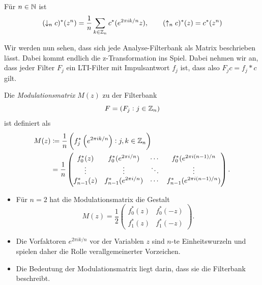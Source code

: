 \begin{proposition}
Für $ n \in \mathbb{N} $ ist
\[
    (\downarrow_{n}c)^{*}(z^{n})
  = \frac{1}{n} \sum_{k \in \mathbb{Z}_{n}} c^{*}(e^{2\pi ik/n}z), \qquad
    (\uparrow_{n}c)^{*}(z) = c^{*}(z^{n})
\]
\end{proposition}

Wir werden nun sehen, dass sich jede Analyse-Filterbank als Matrix beschrieben lässt. Dabei kommt
endlich die z-Transformation ins Spiel. Dabei nehmen wir an, dass jeder Filter $ F_{j} $ ein
LTI-Filter mit Impulsantwort $ f_{j} $ ist, dass also $ F_{j}c = f_{j} * c $ gilt.

\begin{definition}[Modulationsmatrix]
Die \emph{Modulationsmatrix} $ M(z) $ zu der Filterbank
\[
  F = (F_{j} : j \in \mathbb{Z}_{n})
\]
ist definiert als
\begin{align*}
   M(z)
  &\coloneqq \frac{1}{n} \left( f_{j}^{*} \left( e^{2\pi ik/n} \right) : j,k \in \mathbb{Z}_{n} \right) \\
  &= \frac{1}{n} \begin{pmatrix}
    f_{0}^{*}(z) & f_{0}^{*}(e^{2\pi i/n}) & \cdots & f_{0}^{*}(e^{2\pi i(n-1)/n} \\
    \vdots & \vdots & \ddots & \vdots \\
    f_{n-1}^{*}(z) & f_{n-1}^{*}(e^{2\pi i/n}) & \cdots & f_{n-1}^{*}(e^{2\pi i(n-1)/n})
  \end{pmatrix}.
\end{align*}
\end{definition}

\begin{remark}[Modulationsmatrix] \leavevmode
\begin{itemize}
\item Für $ n = 2 $ hat die Modulationsmatrix die Gestalt
  \[
    M(z) = \frac{1}{2}
    \begin{pmatrix}
      f_{0}^{*}(z) & f_{0}^{*}(-z) \\
      f_{1}^{*}(z) & f_{1}^{*}(-z)
    \end{pmatrix}.
  \]
\item Die Vorfaktoren $ e^{2\pi ik/n} $ vor der Variablen $ z $ sind $ n $-te Einheitswurzeln und
  spielen daher die Rolle verallgemeinerter Vorzeichen.
\item Die Bedeutung der Modulationsmatrix liegt darin, dass sie die Filterbank beschreibt.
\end{itemize}
\end{remark}

